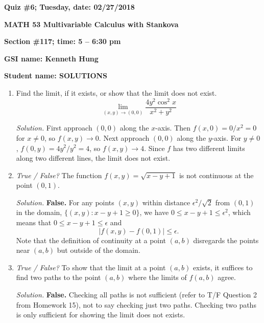 \documentclass{article}
\begin{document}
{\bf Quiz \#6; Tuesday, date: 02/27/2018}

{\bf MATH 53 Multivariable Calculus with Stankova}

{\bf Section \#117; time: 5 -- 6:30 pm}

{\bf GSI name: Kenneth Hung}

{\bf Student name: SOLUTIONS}

\vspace*{0.25in}

\begin{enumerate}
\item Find the limit, if it exists, or show that the limit does not exist.
\[
\lim_{(x, y) \to (0, 0)} \frac{4y^2 \cos^2 x}{x^2 + y^2}
\]

{\em Solution.} First approach $(0, 0)$ along the $x$-axis. Then $f(x, 0) = 0 / x^2 = 0$ for $x \ne 0$, so $f(x, y) \to 0$. Next approach $(0, 0)$ along the $y$-axis. For $y \ne 0$, $f(0, y) = 4y^2 / y^2 = 4$, so $f(x, y) \to 4$. Since $f$ has two different limits along two different lines, the limit does not exist.

\item {\em True / False?} The function $f(x, y) = \sqrt{x - y + 1}$ is not continuous at the point $(0, 1)$.

{\em Solution.} {\bf False.} For any points $(x, y)$ within distance $\epsilon^2 / \sqrt{2}$ from $(0, 1)$ in the domain, $\{(x, y): x - y + 1 \ge 0\}$, we have $0 \le x - y + 1 \le \epsilon^2$, which means that $0 \le x - y + 1 \le \epsilon$ and
\[
|f(x, y) - f(0, 1)| \le \epsilon.
\]
Note that the definition of continuity at a point $(a, b)$ disregards the points near $(a, b)$ but outside of the domain.

\item {\em True / False?} To show that the limit at a point $(a, b)$ exists, it suffices to find two paths to the point $(a, b)$ where the limits of $f(a, b)$ agree.

{\em Solution.} {\bf False.} Checking all paths is not sufficient (refer to T/F Question 2 from Homework 15), not to say checking just two paths. Checking two paths is only sufficient for showing the limit does not exists.
\end{enumerate}
\end{document}
